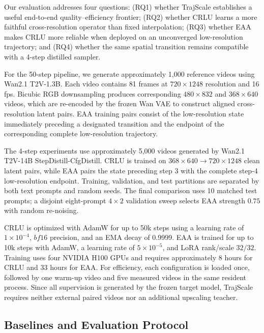 Our evaluation addresses four questions: (RQ1) whether TrajScale establishes a
useful end-to-end quality--efficiency frontier; (RQ2) whether CRLU learns a more
faithful cross-resolution operator than fixed interpolation; (RQ3) whether EAA
makes CRLU more reliable when deployed on an unconverged low-resolution
trajectory; and (RQ4) whether the same spatial transition remains compatible
with a 4-step distilled sampler.

For the 50-step pipeline, we generate approximately 1,000 reference videos
using Wan2.1 T2V-1.3B. Each video contains 81 frames at
\(720\times1248\) resolution and 16 fps. Bicubic RGB downsampling produces
corresponding \(480\times832\) and \(368\times640\) videos, which are
re-encoded by the frozen Wan VAE to construct aligned cross-resolution latent
pairs. EAA training pairs consist of the low-resolution state immediately
preceding a designated transition and the endpoint of the corresponding
complete low-resolution trajectory.

The 4-step experiments use approximately 5,000 videos generated by Wan2.1
T2V-14B StepDistill-CfgDistill. CRLU is trained on
\(368\times640\rightarrow720\times1248\) clean latent pairs, while EAA pairs
the state preceding step 3 with the complete step-4 low-resolution endpoint.
Training, validation, and test partitions are separated by both text prompts
and random seeds. The final comparison uses 10 matched test prompts; a disjoint
eight-prompt \(4\times2\) validation sweep selects EAA strength \(0.75\) with
random re-noising.

CRLU is optimized with AdamW for up to 50k steps using a learning rate of
\(1\times10^{-4}\), \(bf16\) precision, and an EMA decay of 0.9999. EAA is
trained for up to 10k steps with AdamW, a learning rate of
\(5\times10^{-5}\), and LoRA rank/scale \(32/32\). Training uses four NVIDIA
H100 GPUs and requires approximately 8 hours for CRLU and 33 hours for EAA.
For efficiency, each configuration is loaded once, followed by one warm-up
video and five measured videos in the same resident process.
Since all supervision is generated by the frozen target model, TrajScale
requires neither external paired videos nor an additional upscaling teacher.

\subsection{Baselines and Evaluation Protocol}
\label{sec:factorialsetup}

